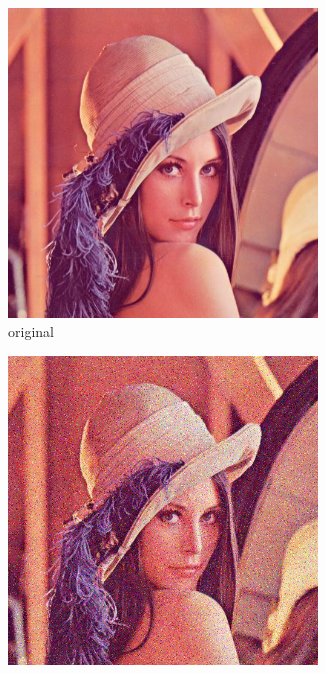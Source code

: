 \documentclass[12pt]{article}
\theoremstyle{definition}
\begin{document}
\begin{figure}[H]\centering
    \begin{subfigure}[t]{0.25\textwidth}\centering
        \includegraphics[width=0.9\textwidth]{lenac.png}
        \caption{original}
    \end{subfigure}
    \begin{subfigure}[t]{0.25\textwidth}\centering
        \includegraphics[width=0.9\textwidth]{lenac_normal3.png}

\end{subfigure}
\end{figure}
\end{document}
